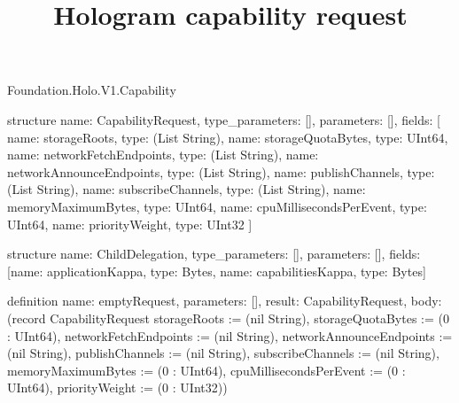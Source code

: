 \begin{lexlean}{Foundation.Holo.V1.Capability}
\title{Hologram capability request}
\begin{semanticmodule}
structure{
  name: CapabilityRequest,
  type_parameters: [],
  parameters: [],
  fields: [
    {name: storageRoots, type: (List String)},
    {name: storageQuotaBytes, type: UInt64},
    {name: networkFetchEndpoints, type: (List String)},
    {name: networkAnnounceEndpoints, type: (List String)},
    {name: publishChannels, type: (List String)},
    {name: subscribeChannels, type: (List String)},
    {name: memoryMaximumBytes, type: UInt64},
    {name: cpuMillisecondsPerEvent, type: UInt64},
    {name: priorityWeight, type: UInt32}
  ]
}

structure{
  name: ChildDelegation,
  type_parameters: [],
  parameters: [],
  fields: [{name: applicationKappa, type: Bytes}, {name: capabilitiesKappa, type: Bytes}]
}

definition{
  name: emptyRequest,
  parameters: [],
  result: CapabilityRequest,
  body: (record CapabilityRequest {storageRoots := (nil String), storageQuotaBytes := (0 : UInt64), networkFetchEndpoints := (nil String), networkAnnounceEndpoints := (nil String), publishChannels := (nil String), subscribeChannels := (nil String), memoryMaximumBytes := (0 : UInt64), cpuMillisecondsPerEvent := (0 : UInt64), priorityWeight := (0 : UInt32)})
}
\end{semanticmodule}
\end{lexlean}
